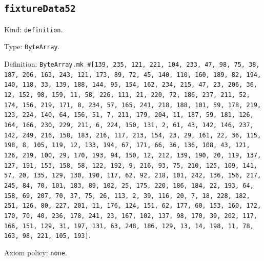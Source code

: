 \documentclass[11pt]{article}
\begin{document}
\subsection*{\texttt{fixtureData52}}
\noindent Kind: \texttt{definition}.\par
\noindent Type: \texttt{ByteArray}.\par
\noindent Definition: \texttt{ByteArray.mk \#[139, 235, 121, 221, 104, 233, 47, 98, 75, 38, 187, 206, 163, 243, 121, 173, 89, 72, 45, 140, 110, 160, 189, 82, 194, 140, 118, 33, 139, 188, 144, 95, 154, 162, 234, 215, 47, 23, 206, 36, 12, 152, 98, 159, 11, 58, 226, 111, 21, 220, 72, 186, 237, 211, 52, 174, 156, 219, 171, 8, 234, 57, 165, 241, 218, 188, 101, 59, 178, 219, 123, 224, 140, 64, 156, 51, 7, 211, 179, 204, 11, 187, 59, 181, 126, 164, 166, 230, 229, 211, 6, 224, 150, 131, 2, 61, 43, 142, 146, 237, 142, 249, 216, 158, 183, 216, 117, 213, 154, 23, 29, 161, 22, 36, 115, 198, 8, 105, 119, 12, 133, 194, 67, 171, 66, 36, 136, 108, 43, 121, 126, 219, 100, 29, 170, 193, 94, 150, 12, 212, 139, 190, 20, 119, 137, 127, 191, 153, 158, 58, 122, 192, 9, 216, 93, 75, 210, 125, 109, 141, 57, 20, 135, 129, 130, 190, 117, 62, 92, 218, 101, 242, 136, 156, 217, 245, 84, 70, 101, 183, 89, 102, 25, 175, 220, 186, 184, 22, 193, 64, 158, 69, 207, 70, 37, 75, 26, 113, 2, 39, 116, 20, 7, 18, 228, 182, 251, 126, 80, 227, 201, 11, 176, 124, 151, 62, 177, 60, 153, 160, 172, 170, 70, 40, 236, 178, 241, 23, 167, 102, 137, 98, 170, 39, 202, 117, 166, 151, 129, 31, 197, 131, 63, 248, 186, 129, 13, 14, 198, 11, 78, 163, 98, 221, 105, 193]}.\par
\noindent Axiom policy: \texttt{none}.\par
\end{document}
